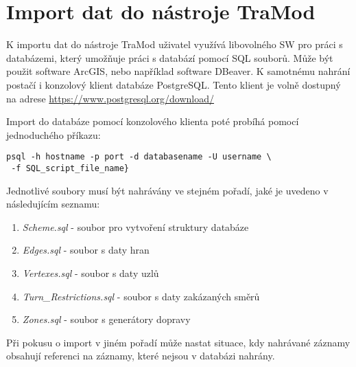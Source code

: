 \section{Import dat do nástroje TraMod}

K importu dat do nástroje TraMod uživatel využívá libovolného SW pro práci s databázemi, který umožňuje práci s databází pomocí SQL souborů. Může být použit software ArcGIS, nebo například software DBeaver. K samotnému nahrání postačí i konzolový klient databáze PostgreSQL. Tento klient je volně dostupný na adrese \url{https://www.postgresql.org/download/}

Import do databáze pomocí konzolového klienta poté probíhá pomocí jednoduchého příkazu:

\begin{lstlisting}
psql -h hostname -p port -d databasename -U username \
 -f SQL_script_file_name}
\end{lstlisting}

Jednotlivé soubory musí být nahrávány ve stejném pořadí, jaké je uvedeno v následujícím seznamu: 

\begin{enumerate}
	\item \textit{Scheme.sql} - soubor pro vytvoření struktury databáze
	\item \textit{Edges.sql} - soubor s daty hran
	\item \textit{Vertexes.sql} - soubor s daty uzlů
	\item \textit{Turn\_Restrictions.sql} - soubor s daty zakázaných směrů
	\item \textit{Zones.sql} - soubor s generátory dopravy
\end{enumerate}

Při pokusu o import v jiném pořadí může nastat situace, kdy nahrávané záznamy obsahují referenci na záznamy, které nejsou v databázi nahrány. 







